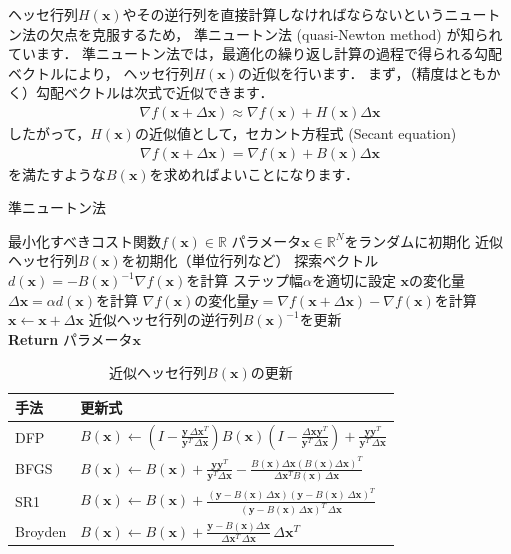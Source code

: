 ヘッセ行列$H(\bm{x})$やその逆行列を直接計算しなければならないというニュートン法の欠点を克服するため，
準ニュートン法 (quasi-Newton method) が知られています．
準ニュートン法では，最適化の繰り返し計算の過程で得られる勾配ベクトルにより，
ヘッセ行列$H(\bm{x})$の近似を行います．
まず，（精度はともかく）勾配ベクトルは次式で近似できます．
\begin{align}
 \nabla f(\bm{x} + \Delta\bm{x}) \approx \nabla f(\bm{x}) + H(\bm{x})\Delta\bm{x}
\end{align}
したがって，$H(\bm{x})$の近似値として，セカント方程式 (Secant equation)
\begin{align}
 \nabla f(\bm{x} + \Delta\bm{x}) = \nabla f(\bm{x}) + B(\bm{x})\Delta\bm{x}
\end{align}
を満たすような$B(\bm{x})$を求めればよいことになります．

\begin{algobox}{準ニュートン法}
\label{algo:quasi_newton}
\begin{algorithmic}[1]
\Require 最小化すべきコスト関数$f(\bm{x}) \in \mathbb{R}$
\State パラメータ$\bm{x} \in \mathbb{R}^N$をランダムに初期化
\State 近似ヘッセ行列$B(\bm{x})$を初期化（単位行列など）
\State 探索ベクトル$d(\bm{x}) = - B(\bm{x})^{-1} \nabla f(\bm{x})$を計算
\State ステップ幅$\alpha$を適切に設定
\State $\bm{x}$の変化量$\Delta\bm{x} = \alpha d(\bm{x})$を計算
\State $\nabla f(\bm{x})$の変化量$\bm{y} = \nabla f(\bm{x} + \Delta\bm{x}) - \nabla f(\bm{x})$を計算
\State $\bm{x} \gets \bm{x} + \Delta\bm{x}$
\State 近似ヘッセ行列の逆行列$B(\bm{x})^{-1}$を更新
\EndWhile\\
{\bf Return} パラメータ$\bm{x}$
\end{algorithmic}
\end{algobox}

\begin{table}[t]
\centering
\caption{近似ヘッセ行列$B(\bm{x})$の更新}
\label{tab:hessian_update}
\begin{tabular}{l|l}
\hline
手法 & 更新式
\\
\hline
DFP 
&
$\displaystyle B(\bm{x}) \gets \left (I-\frac {\bm{y} \, \Delta\bm{x}^T} {\bm{y}^T \, \Delta\bm{x}} \right ) B(\bm{x}) \left (I-\frac {\Delta\bm{x} \bm{y}^T} {\bm{y}^T \, \Delta\bm{x}} \right )+\frac{\bm{y} \bm{y}^T} {\bm{y}^T \, \Delta\bm{x}}$
\parbox[c][9.5mm][c]{0cm}{}\\
BFGS
&
$\displaystyle B(\bm{x}) \gets B(\bm{x}) + \frac {\bm{y} \bm{y}^T}{\bm{y}^{T} \Delta\bm{x}} - \frac {B(\bm{x}) \Delta\bm{x} (B(\bm{x}) \Delta\bm{x})^T} {\Delta\bm{x}^{T} B(\bm{x}) \, \Delta\bm{x}}$
\parbox[c][9.5mm][c]{0cm}{}\\
SR1
&
$\displaystyle B(\bm{x}) \gets B(\bm{x}) +\frac {(\bm{y}-B(\bm{x}) \, \Delta\bm{x}) (\bm{y}-B(\bm{x}) \, \Delta\bm{x})^T}{(\bm{y}-B(\bm{x}) \, \Delta\bm{x})^T \, \Delta\bm{x}}$
\parbox[c][9.5mm][c]{0cm}{}\\
Broyden
&
$\displaystyle B(\bm{x}) \gets B(\bm{x})+\frac {\bm{y}-B(\bm{x}) \Delta\bm{x}}{\Delta\bm{x}^T \, \Delta\bm{x}} \, \Delta\bm{x}^T$
\parbox[c][9.5mm][c]{0cm}{}\\
\hline
\end{tabular}
\end{table}

